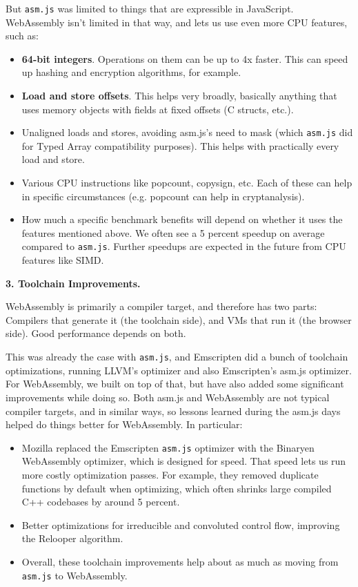 But \texttt{asm.js} was limited to things that are expressible in JavaScript. WebAssembly isn’t limited in that way, and lets us use even more CPU features, such as:
\begin{itemize}
\item \textbf{64-bit integers}. Operations on them can be up to 4x faster. This can speed up hashing and encryption algorithms, for example.
\item \textbf{Load and store offsets}. This helps very broadly, basically anything that uses memory objects with fields at fixed offsets (C structs, etc.).
\item Unaligned loads and stores, avoiding asm.js’s need to mask (which \texttt{asm.js} did for Typed Array compatibility purposes). 
      This helps with practically every load and store.
\item Various CPU instructions like popcount, copysign, etc. Each of these can help in specific circumstances (e.g. popcount can help in cryptanalysis).
\item How much a specific benchmark benefits will depend on whether it uses the features mentioned above. 
      We often see a 5 percent speedup on average compared to \texttt{asm.js}. Further speedups are expected in the future from CPU features like SIMD.
\end{itemize}
\textbf{3. Toolchain Improvements.}

WebAssembly is primarily a compiler target, and therefore has two parts: Compilers that generate it (the toolchain side), and VMs that run it (the browser side). Good performance depends on both.

This was already the case with \texttt{asm.js}, and Emscripten did a bunch of toolchain optimizations, running LLVM’s optimizer and also Emscripten’s asm.js optimizer. For WebAssembly, we built on top of that, but have also added some significant improvements while doing so. Both asm.js and WebAssembly are not typical compiler targets, and in similar ways, so lessons learned during the asm.js days helped do things better for WebAssembly. In particular:
\begin{itemize}
\item Mozilla replaced the Emscripten \texttt{asm.js} optimizer with the Binaryen WebAssembly optimizer, which is designed for speed. That speed lets us run more costly optimization passes. For example, they removed duplicate functions by default when optimizing, which often shrinks large compiled C++ codebases by around 5 percent.
\item Better optimizations for irreducible and convoluted control flow, improving the Relooper algorithm.
\item Overall, these toolchain improvements help about as much as moving from \texttt{asm.js} to WebAssembly.
\end{itemize}
  
